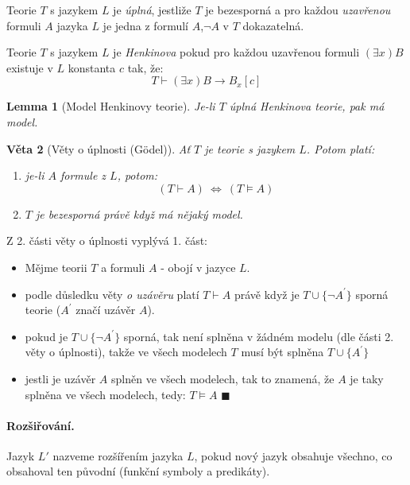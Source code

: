 \documentclass[a4paper]{article}      %
\newtheorem{theorem}{Věta}[section]
\newtheorem{lemma}[theorem]{Lemma}
\newenvironment{definition}[1][Definice]{\begin{trivlist}
\item[\hskip \labelsep {\bfseries #1}]}{\end{trivlist}}
\newenvironment{remark}[1][Pozorování]{\begin{trivlist}
\item[\hskip \labelsep {\bfseries #1}]}{\end{trivlist}}
\newcommand{\qed}{$\blacksquare$}
\begin{document}
\begin{definition}[Úplná teorie]
Teorie $T$ s jazykem  $L$ je \emph{úplná}, jestliže $T$ je bezesporná
a pro každou \emph{uzavřenou} formuli $A$ jazyka $L$ je jedna z formulí $A$,$\neg A$ v $T$ dokazatelná.
\end{definition}

\begin{definition}[Henkinova teorie]
Teorie $T$ s jazykem $L$ je \emph{Henkinova} pokud pro každou uzavřenou formuli $(\exists x) B$ existuje v $L$ konstanta $c$ tak,
že:
\[
T \vdash (\exists x)B \rightarrow B_{x}[c]
\]
\end{definition}

\begin{lemma}[Model Henkinovy teorie]
Je-li $T$ úplná Henkinova teorie, pak má model.
\end{lemma}

\begin{theorem}[Věty o úplnosti (G\"{o}del)]
Ať $T$ je teorie s jazykem $L$. Potom platí:
\begin{enumerate}
\item je-li $A$ formule z $L$, potom:
\[
(T \vdash A)\ \Leftrightarrow\ (T \models A)
\]
\item $T$ je bezesporná právě když má nějaký model.
\end{enumerate}
\end{theorem}

\begin{remark}
Z 2. části věty o úplnosti vyplývá 1. část:
\begin{itemize}
\item Mějme teorii $T$ a formuli $A$ - obojí v jazyce $L$.
\item podle důsledku věty \emph{o uzávěru} platí $T \vdash A$ právě když je $T \cup \lbrace \neg A^{'} \rbrace$ sporná teorie ($A^{'}$ značí uzávěr $A$).
\item pokud je $T \cup \lbrace \neg A^{'} \rbrace$ sporná, tak není splněna v žádném modelu (dle části 2. věty o úplnosti), takže ve všech modelech 
$T$ musí být splněna $T \cup \lbrace A^{'} \rbrace$
\item jestli je uzávěr $A$ splněn ve všech modelech, tak to znamená, že $A$ je taky splněna ve všech modelech, tedy: $T \models A$ \qed
\end{itemize}
\end{remark}

\paragraph{Rozšiřování.} Jazyk $L'$ nazveme rozšířením jazyka $L$, pokud nový jazyk obsahuje všechno, co obsahoval ten původní (funkční symboly a predikáty).
\end{document}
